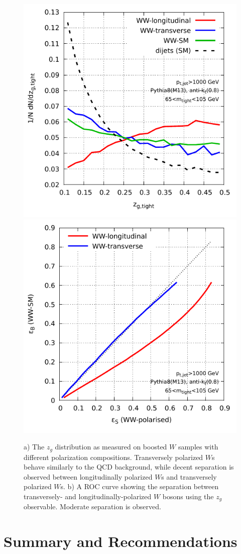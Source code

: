 \documentclass[11pt,letterpaper]{article}
\begin{document}
\begin{figure}
\begin{center}
\includegraphics[width=0.45\columnwidth]{figures/polarisation-zg-distrib}
  \hfill
\includegraphics[width=0.45\columnwidth]{figures/polarisation-zg-roc}
\end{center}
\caption{a) The $z_g$ distribution as measured on boosted $W$ samples with different polarization compositions. Transversely polarized $W$s behave similarly to the QCD background, while decent separation is observed between longitudinally polarized $W$s and transversely polarized $W$s. b) A ROC curve showing the separation between transversely- and longitudinally-polarized $W$ bosons using the $z_g$ observable. Moderate separation is observed.}
\label{fig:z_g_dist}
\end{figure}











\section{Summary and Recommendations}\label{sec:conc}
\end{document}
